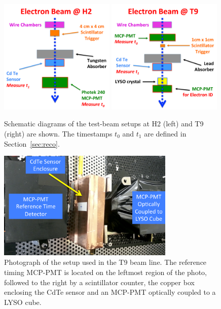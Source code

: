 \begin{figure}[htbp] 
\centering
\includegraphics[width=0.49\textwidth]{figures/H2_BeamSchematicDiagram.pdf} 
\includegraphics[width=0.49\textwidth]{figures/T9_BeamSchematicDiagram.pdf} 
\caption{Schematic diagrams of the test-beam setups at H2 (left) and T9 (right) are shown. 
The timestamps $t_0$ and $t_1$ are defined in Section~\ref{sec:reco}.} 
\label{fig:BeamSchematicDiagram} 
\end{figure} 

\begin{figure}[htbp] 
\centering
\includegraphics[width=0.75\textwidth]{figures/T9SetupPhoto.pdf} 
\caption{ Photograph of the setup used in the T9 beam line. The reference timing MCP-PMT 
is located on the leftmost region of the photo, followed to the right by a scintillator counter, 
the copper box enclosing the CdTe sensor and an MCP-PMT optically coupled to a LYSO cube. } 
\label{fig:SetupPhoto} 
\end{figure} 


